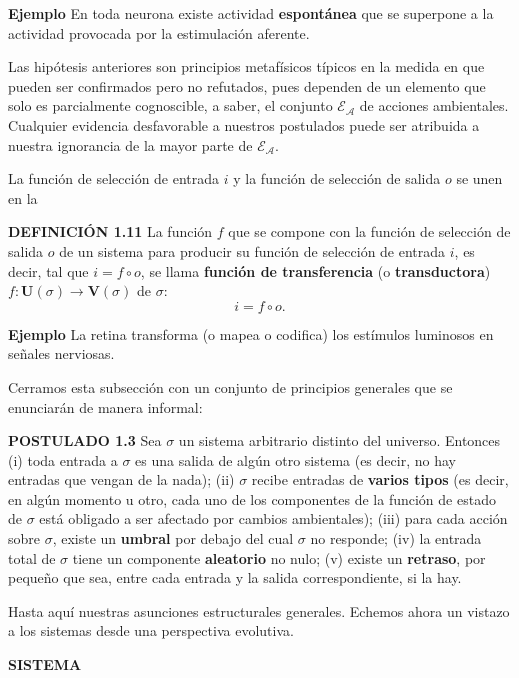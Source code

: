 {\fontsize{13}{15}\selectfont
\textbf{Ejemplo} En toda neurona existe actividad \textbf{espontánea} que se superpone a la actividad provocada por la estimulación aferente.

Las hipótesis anteriores son principios metafísicos típicos en la medida en que pueden ser confirmados pero no refutados, pues dependen de un elemento que solo es parcialmente cognoscible, a saber, el conjunto $\mathcal{E}_{\mathcal{A}}$ de acciones ambientales. Cualquier evidencia desfavorable a nuestros postulados puede ser atribuida a nuestra ignorancia de la mayor parte de $\mathcal{E}_{\mathcal{A}}$.

La función de selección de entrada $i$ y la función de selección de salida $o$ se unen en la

\textbf{DEFINICIÓN 1.11} La función $f$ que se compone con la función de selección de salida $o$ de un sistema para producir su función de selección de entrada $i$, es decir, tal que $i = f \circ o$, se llama \textbf{función de transferencia} (o \textbf{transductora}) $f: \mathbf{U}(\sigma) \longrightarrow \mathbf{V}(\sigma)$ de $\sigma$:
$$ i = f \circ o. $$

\textbf{Ejemplo} La retina transforma (o mapea o codifica) los estímulos luminosos en señales nerviosas.

Cerramos esta subsección con un conjunto de principios generales que se enunciarán de manera informal:

\textbf{POSTULADO 1.3} Sea $\sigma$ un sistema arbitrario distinto del universo. Entonces
(i) toda entrada a $\sigma$ es una salida de algún otro sistema (es decir, no hay entradas que vengan de la nada);
(ii) $\sigma$ recibe entradas de \textbf{varios tipos} (es decir, en algún momento u otro, cada uno de los componentes de la función de estado de $\sigma$ está obligado a ser afectado por cambios ambientales);
(iii) para cada acción sobre $\sigma$, existe un \textbf{umbral} por debajo del cual $\sigma$ no responde;
(iv) la entrada total de $\sigma$ tiene un componente \textbf{aleatorio} no nulo;
(v) existe un \textbf{retraso}, por pequeño que sea, entre cada entrada y la salida correspondiente, si la hay.

Hasta aquí nuestras asunciones estructurales generales. Echemos ahora un vistazo a los sistemas desde una perspectiva evolutiva.
}

\newpage
\fancyhf{}
\fancyhead[r]{\thepage}
\begin{center}
{\fontsize{13}{16}\selectfont \textbf{SISTEMA}}
\end{center}
\vspace{0.5cm}

